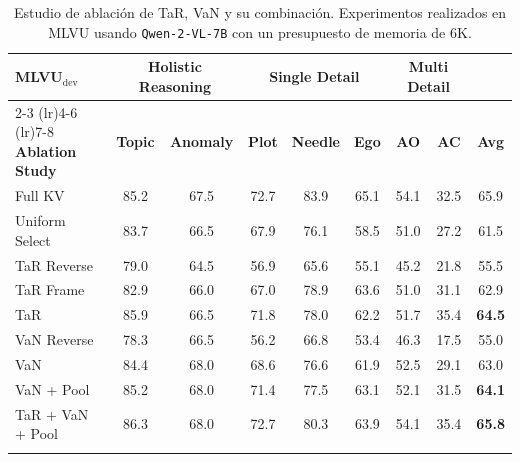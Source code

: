 \begin{table}[t]
\small
  \centering
  \begin{tabular}{l c c c c c c c c}
    \toprule
    \textbf{MLVU}$_\text{dev} $& \multicolumn{2}{c}{\textbf{Holistic Reasoning}} 
    & \multicolumn{3}{c}{\textbf{Single Detail}} 
    & \multicolumn{2}{c}{\textbf{Multi Detail}} \\
    \cmidrule(lr){2-3} \cmidrule(lr){4-6} \cmidrule(lr){7-8}
    \textbf{Ablation Study} 
      & \textbf{Topic}  & \textbf{Anomaly} 
      & \textbf{Plot}   & \textbf{Needle} 
      & \textbf{Ego}    & \textbf{AO} 
      & \textbf{AC}     & \textbf{Avg} \\
    \midrule
    Full KV           & 85.2 & 67.5 & 72.7 & 83.9 & 65.1 & 54.1 & 32.5 & 65.9 \\ \midrule
    Uniform Select    & 83.7 & 66.5 & 67.9 & 76.1 & 58.5 & 51.0 & 27.2 & 61.5 \\ \midrule
    TaR Reverse       & 79.0 & 64.5 & 56.9 & 65.6 & 55.1 & 45.2 & 21.8 & 55.5 \\
    TaR Frame         & 82.9 & 66.0 & 67.0 & 78.9 & 63.6 & 51.0 & 31.1 & 62.9 \\
    TaR               & 85.9 & 66.5 & 71.8 & 78.0 & 62.2 & 51.7 & 35.4 & \textbf{64.5} \\ \midrule
    VaN Reverse       & 78.3 & 66.5 & 56.2 & 66.8 & 53.4 & 46.3 & 17.5 & 55.0 \\ 
    VaN               & 84.4 & 68.0 & 68.6 & 76.6 & 61.9 & 52.5 & 29.1 & 63.0  \\ 
    VaN + Pool        & 85.2 & 68.0 & 71.4 & 77.5 & 63.1 & 52.1 & 31.5 & \textbf{64.1} \\ \midrule
    TaR + VaN + Pool   & 86.3 & 68.0 & 72.7 & 80.3 & 63.9 & 54.1 & 35.4 & \textbf{65.8} \\
    \bottomrule
    \vspace{1mm}
  \end{tabular}
  \caption{Estudio de ablación de TaR, VaN y su combinación. Experimentos realizados en MLVU usando \texttt{Qwen-2-VL-7B} con un presupuesto de memoria de 6K.}
    \vspace{-.2in}
\label{tab:ablate}
\end{table}
 
